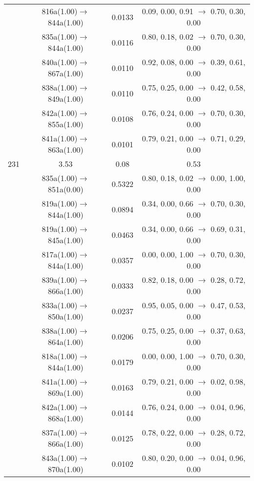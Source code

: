 \documentclass[10pt,a4paper]{article}
\begin{document}
\begin{longtable}{c|c|c|c}
 	& 816a(1.00)$\rightarrow$844a(1.00) &	 0.0133 &	 0.09, 0.00, 0.91 $\rightarrow$ 0.70, 0.30, 0.00 \\ 
 	& 835a(1.00)$\rightarrow$844a(1.00) &	 0.0116 &	 0.80, 0.18, 0.02 $\rightarrow$ 0.70, 0.30, 0.00 \\ 
 	& 840a(1.00)$\rightarrow$867a(1.00) &	 0.0110 &	 0.92, 0.08, 0.00 $\rightarrow$ 0.39, 0.61, 0.00 \\ 
 	& 838a(1.00)$\rightarrow$849a(1.00) &	 0.0110 &	 0.75, 0.25, 0.00 $\rightarrow$ 0.42, 0.58, 0.00 \\ 
 	& 842a(1.00)$\rightarrow$855a(1.00) &	 0.0108 &	 0.76, 0.24, 0.00 $\rightarrow$ 0.70, 0.30, 0.00 \\ 
 	& 841a(1.00)$\rightarrow$863a(1.00) &	 0.0101 &	 0.79, 0.21, 0.00 $\rightarrow$ 0.71, 0.29, 0.00 \\ 
 \hline231 &	 3.53 &	 0.08 &	 0.53 \\ 
  	& 835a(1.00)$\rightarrow$851a(0.00) &	 0.5322 &	 0.80, 0.18, 0.02 $\rightarrow$ 0.00, 1.00, 0.00 \\ 
 	& 819a(1.00)$\rightarrow$844a(1.00) &	 0.0894 &	 0.34, 0.00, 0.66 $\rightarrow$ 0.70, 0.30, 0.00 \\ 
 	& 819a(1.00)$\rightarrow$845a(1.00) &	 0.0463 &	 0.34, 0.00, 0.66 $\rightarrow$ 0.69, 0.31, 0.00 \\ 
 	& 817a(1.00)$\rightarrow$844a(1.00) &	 0.0357 &	 0.00, 0.00, 1.00 $\rightarrow$ 0.70, 0.30, 0.00 \\ 
 	& 839a(1.00)$\rightarrow$866a(1.00) &	 0.0333 &	 0.82, 0.18, 0.00 $\rightarrow$ 0.28, 0.72, 0.00 \\ 
 	& 833a(1.00)$\rightarrow$850a(1.00) &	 0.0237 &	 0.95, 0.05, 0.00 $\rightarrow$ 0.47, 0.53, 0.00 \\ 
 	& 838a(1.00)$\rightarrow$864a(1.00) &	 0.0206 &	 0.75, 0.25, 0.00 $\rightarrow$ 0.37, 0.63, 0.00 \\ 
 	& 818a(1.00)$\rightarrow$844a(1.00) &	 0.0179 &	 0.00, 0.00, 1.00 $\rightarrow$ 0.70, 0.30, 0.00 \\ 
 	& 841a(1.00)$\rightarrow$869a(1.00) &	 0.0163 &	 0.79, 0.21, 0.00 $\rightarrow$ 0.02, 0.98, 0.00 \\ 
 	& 842a(1.00)$\rightarrow$868a(1.00) &	 0.0144 &	 0.76, 0.24, 0.00 $\rightarrow$ 0.04, 0.96, 0.00 \\ 
 	& 837a(1.00)$\rightarrow$866a(1.00) &	 0.0125 &	 0.78, 0.22, 0.00 $\rightarrow$ 0.28, 0.72, 0.00 \\ 
 	& 843a(1.00)$\rightarrow$870a(1.00) &	 0.0102 &	 0.80, 0.20, 0.00 $\rightarrow$ 0.04, 0.96, 0.00 \\ 

\end{longtable}
\end{document}
